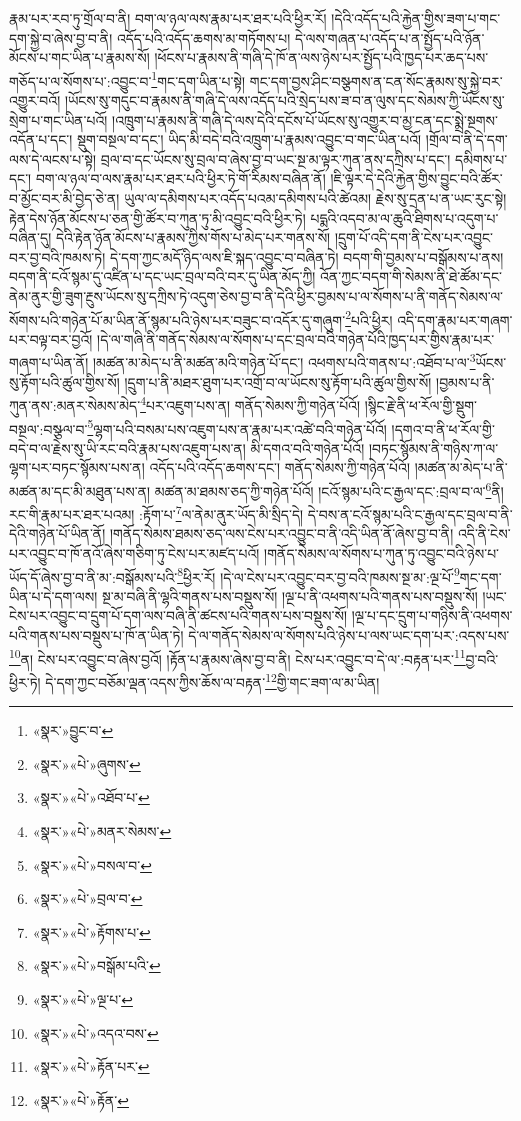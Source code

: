 རྣམ་པར་རབ་ཏུ་གྲོལ་བ་ནི། བག་ལ་ཉལ་ལས་རྣམ་པར་ཐར་པའི་ཕྱིར་རོ། །དེའི་འདོད་པའི་རྐྱེན་གྱིས་ཟག་པ་གང་དག་སྐྱེ་བ་ཞེས་བྱ་བ་ནི། འདོད་པའི་འདོད་ཆགས་མ་གཏོགས་པ། དེ་ལས་གཞན་པ་འདོད་པ་ན་སྤྱོད་པའི་ཉོན་མོངས་པ་གང་ཡིན་པ་རྣམས་སོ། །ཕོངས་པ་རྣམས་ནི་གཞི་དེ་ཁོ་ན་ལས་ཉེས་པར་སྤྱོད་པའི་ཁྱད་པར་ཆད་པས་གཅོད་པ་ལ་སོགས་པ་:འབྱུང་བ་\footnote{«སྣར་»བྱུང་བ་}གང་དག་ཡིན་པ་སྟེ། གང་དག་བྱས་ཤིང་བསྩགས་ན་ངན་སོང་རྣམས་སུ་སྐྱེ་བར་འགྱུར་བའོ། །ཡོངས་སུ་གདུང་བ་རྣམས་ནི་གཞི་དེ་ལས་འདོད་པའི་སྲེད་པས་ཟ་བ་ན་ལུས་དང་སེམས་ཀྱི་ཡོངས་སུ་སྲེག་པ་གང་ཡིན་པའོ། །འཁྲུག་པ་རྣམས་ནི་གཞི་དེ་ལས་དེའི་དངོས་པོ་ཡོངས་སུ་འགྱུར་བ་མྱ་ངན་དང་སྨྲེ་སྔགས་འདོན་པ་དང་། སྡུག་བསྔལ་བ་དང་། ཡིད་མི་བདེ་བའི་འཁྲུག་པ་རྣམས་འབྱུང་བ་གང་ཡིན་པའོ། །གྲོལ་བ་ནི་དེ་དག་ལས་དེ་ལངས་པ་སྟེ། བྲལ་བ་དང་ཡོངས་སུ་བྲལ་བ་ཞེས་བྱ་བ་ཡང་སྔ་མ་ལྟར་ཀུན་ནས་དཀྲིས་པ་དང་། དམིགས་པ་དང་། བག་ལ་ཉལ་བ་ལས་རྣམ་པར་ཐར་པའི་ཕྱིར་ཏེ་གོ་རིམས་བཞིན་ནོ། །ཇི་ལྟར་དེ་དེའི་རྐྱེན་གྱིས་བྱུང་བའི་ཚོར་བ་མྱོང་བར་མི་བྱེད་ཅེ་ན། ཡུལ་ལ་དམིགས་པར་འདོད་པའམ་དམིགས་པའི་ཚེའམ། རྗེས་སུ་དྲན་པ་ན་ཡང་རུང་སྟེ། རྟེན་དེས་ཉོན་མོངས་པ་ཅན་གྱི་ཚོར་བ་ཀུན་ཏུ་མི་འབྱུང་བའི་ཕྱིར་ཏེ། པདྨའི་འདབ་མ་ལ་ཆུའི་ཐིགས་པ་འདུག་པ་བཞིན་དུ། དེའི་རྟེན་ཉོན་མོངས་པ་རྣམས་ཀྱིས་གོས་པ་མེད་པར་གནས་སོ། །དྲུག་པོ་འདི་དག་ནི་ངེས་པར་འབྱུང་བར་བྱ་བའི་ཁམས་ཏེ། དེ་དག་ཀྱང་མདོ་ཉིད་ལས་ཇི་སྐད་འབྱུང་བ་བཞིན་ཏེ། བདག་གི་བྱམས་པ་བསྒོམས་པ་ནས། བདག་ནི་ངའོ་སྙམ་དུ་འཛིན་པ་དང་ཡང་བྲལ་བའི་བར་དུ་ཡིན་མོད་ཀྱི། འོན་ཀྱང་བདག་གི་སེམས་ནི་ཐེ་ཚོམ་དང་ནེམ་ནུར་གྱི་ཟུག་རྔུས་ཡོངས་སུ་དཀྲིས་ཏེ་འདུག་ཅེས་བྱ་བ་ནི་དེའི་ཕྱིར་བྱམས་པ་ལ་སོགས་པ་ནི་གནོད་སེམས་ལ་སོགས་པའི་གཉེན་པོ་མ་ཡིན་ནོ་སྙམ་པའི་ཉེས་པར་བཟུང་བ་འདོར་དུ་གཞུག་\footnote{«སྣར་»«པེ་»ཞུགས་}པའི་ཕྱིར། འདི་དག་རྣམ་པར་གཞག་པར་བལྟ་བར་བྱའོ། །དེ་ལ་གཞི་ནི་གནོད་སེམས་ལ་སོགས་པ་དང་བྲལ་བའི་གཉེན་པོའི་ཁྱད་པར་གྱིས་རྣམ་པར་གཞག་པ་ཡིན་ནོ། །མཚན་མ་མེད་པ་ནི་མཚན་མའི་གཉེན་པོ་དང་། འཕགས་པའི་གནས་པ་:འཐོབ་པ་ལ་\footnote{«སྣར་»«པེ་»འཐོབ་པ་}ཡོངས་སུ་རྟོག་པའི་ཚུལ་གྱིས་སོ། །དྲུག་པ་ནི་མཐར་ཐུག་པར་འགྲོ་བ་ལ་ཡོངས་སུ་རྟོག་པའི་ཚུལ་གྱིས་སོ། །བྱམས་པ་ནི་ཀུན་ནས་:མནར་སེམས་མེད་\footnote{«སྣར་»«པེ་»མནར་སེམས་}པར་འཇུག་པས་ན། གནོད་སེམས་ཀྱི་གཉེན་པོའོ། །སྙིང་རྗེ་ནི་ཕ་རོལ་གྱི་སྡུག་བསྔལ་:བསྩལ་བ་\footnote{«སྣར་»«པེ་»བསལ་བ་}ལྷག་པའི་བསམ་པས་འཇུག་པས་ན་རྣམ་པར་འཚེ་བའི་གཉེན་པོའོ། །དགའ་བ་ནི་ཕ་རོལ་གྱི་བདེ་བ་ལ་རྗེས་སུ་ཡི་རང་བའི་རྣམ་པས་འཇུག་པས་ན། མི་དགའ་བའི་གཉེན་པོའོ། །བཏང་སྙོམས་ནི་གཉིས་ཀ་ལ་ལྷག་པར་བཏང་སྙོམས་པས་ན། འདོད་པའི་འདོད་ཆགས་དང་། གནོད་སེམས་ཀྱི་གཉེན་པོའོ། །མཚན་མ་མེད་པ་ནི་མཚན་མ་དང་མི་མཐུན་པས་ན། མཚན་མ་ཐམས་ཅད་ཀྱི་གཉེན་པོའོ། །ངའོ་སྙམ་པའི་ང་རྒྱལ་དང་:བྲལ་བ་ལ་\footnote{«སྣར་»«པེ་»བྲལ་བ་}ནི། རང་གི་རྣམ་པར་ཐར་པའམ། :རྟོག་པ་\footnote{«སྣར་»«པེ་»རྟོགས་པ་}ལ་ནེམ་ནུར་ཡོད་མི་སྲིད་དེ། དེ་བས་ན་ངའོ་སྙམ་པའི་ང་རྒྱལ་དང་བྲལ་བ་ནི་དེའི་གཉེན་པོ་ཡིན་ནོ། །གནོད་སེམས་ཐམས་ཅད་ལས་ངེས་པར་འབྱུང་བ་ནི་འདི་ཡིན་ནོ་ཞེས་བྱ་བ་ནི། འདི་ནི་ངེས་པར་འབྱུང་བ་ཁོ་ནའོ་ཞེས་གཅིག་ཏུ་ངེས་པར་མཛད་པའོ། །གནོད་སེམས་ལ་སོགས་པ་ཀུན་ཏུ་འབྱུང་བའི་ཉེས་པ་ཡོད་དོ་ཞེས་བྱ་བ་ནི་མ་:བསྒོམས་པའི་\footnote{«སྣར་»«པེ་»བསྒོམ་པའི་}ཕྱིར་རོ། །དེ་ལ་ངེས་པར་འབྱུང་བར་བྱ་བའི་ཁམས་སྔ་མ་:ལྔ་པོ་\footnote{«སྣར་»«པེ་»ལྔ་པ་}གང་དག་ཡིན་པ་དེ་དག་ལས། སྔ་མ་བཞི་ནི་ལྷའི་གནས་པས་བསྡུས་སོ། །ལྔ་པ་ནི་འཕགས་པའི་གནས་པས་བསྡུས་སོ། །ཡང་ངེས་པར་འབྱུང་བ་དྲུག་པོ་དག་ལས་བཞི་ནི་ཚངས་པའི་གནས་པས་བསྡུས་སོ། །ལྔ་པ་དང་དྲུག་པ་གཉིས་ནི་འཕགས་པའི་གནས་པས་བསྡུས་པ་ཁོ་ན་ཡིན་ཏེ། དེ་ལ་གནོད་སེམས་ལ་སོགས་པའི་ཉེས་པ་ལས་ཡང་དག་པར་:འདས་པས་\footnote{«སྣར་»«པེ་»འདའ་བས་}ན། ངེས་པར་འབྱུང་བ་ཞེས་བྱའོ། །རྟོན་པ་རྣམས་ཞེས་བྱ་བ་ནི། ངེས་པར་འབྱུང་བ་དེ་ལ་:བརྟན་པར་\footnote{«སྣར་»«པེ་»རྟོན་པར་}བྱ་བའི་ཕྱིར་ཏེ། དེ་དག་ཀྱང་བཅོམ་ལྡན་འདས་ཀྱིས་ཆོས་ལ་བརྟན་\footnote{«སྣར་»«པེ་»རྟོན་}གྱི་གང་ཟག་ལ་མ་ཡིན། 